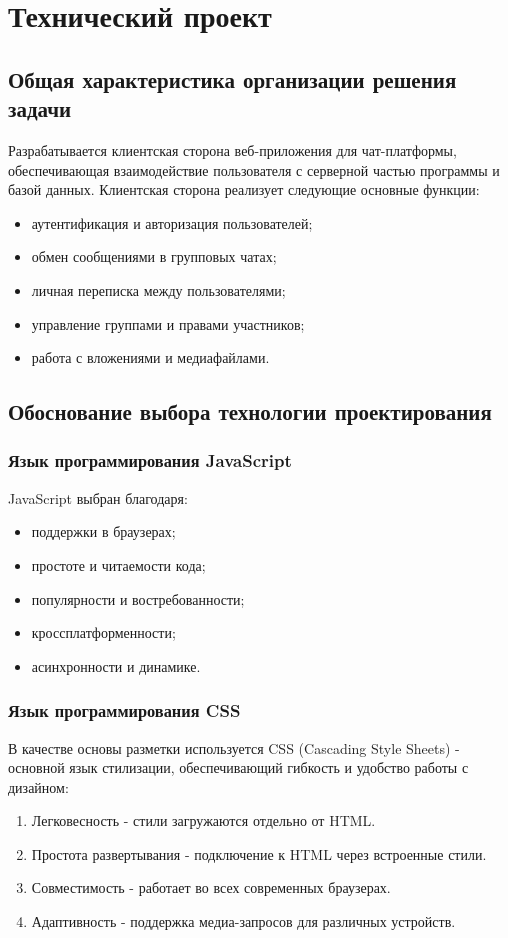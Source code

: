 \section{Технический проект}
\subsection{Общая характеристика организации решения задачи}

Разрабатывается клиентская сторона веб-приложения для чат-платформы, обеспечивающая взаимодействие пользователя с серверной частью программы и базой данных. Клиентская сторона реализует следующие основные функции:
\begin{itemize}
	\item аутентификация и авторизация пользователей;
	\item обмен сообщениями в групповых чатах;
	\item личная переписка между пользователями;
	\item управление группами и правами участников;
	\item работа с вложениями и медиафайлами.
\end{itemize}

\subsection{Обоснование выбора технологии проектирования}

\subsubsection{Язык программирования JavaScript}

JavaScript выбран благодаря:
\begin{itemize}
	\item поддержки в браузерах;
	\item простоте и читаемости кода;
	\item популярности и востребованности;
	\item кроссплатформенности;
	\item асинхронности и динамике.
\end{itemize}

\subsubsection{Язык программирования CSS}

В качестве основы разметки используется CSS (Cascading Style Sheets) - основной язык стилизации, обеспечивающий гибкость и удобство работы с дизайном:
\begin{enumerate}
	\item Легковесность - стили загружаются отдельно от HTML.
	\item Простота развертывания - подключение к HTML через встроенные стили.
	\item Совместимость - работает во всех современных браузерах.
	\item Адаптивность - поддержка медиа-запросов для различных устройств.
\end{enumerate}

